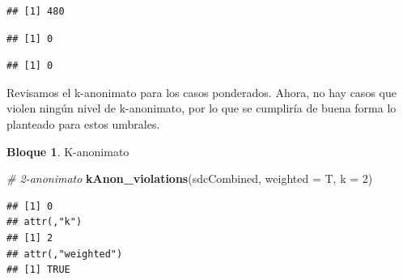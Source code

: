 \documentclass[]{book}
\newenvironment{Shaded}{\begin{snugshade}}{\end{snugshade}}
\newcommand{\CommentTok}[1]{\textcolor[rgb]{0.56,0.35,0.01}{\textit{#1}}}
\newcommand{\DataTypeTok}[1]{\textcolor[rgb]{0.13,0.29,0.53}{#1}}
\newcommand{\DecValTok}[1]{\textcolor[rgb]{0.00,0.00,0.81}{#1}}
\newcommand{\FloatTok}[1]{\textcolor[rgb]{0.00,0.00,0.81}{#1}}
\newcommand{\KeywordTok}[1]{\textcolor[rgb]{0.13,0.29,0.53}{\textbf{#1}}}
\newcommand{\NormalTok}[1]{#1}
\newcommand{\OperatorTok}[1]{\textcolor[rgb]{0.81,0.36,0.00}{\textbf{#1}}}
\newcommand{\StringTok}[1]{\textcolor[rgb]{0.31,0.60,0.02}{#1}}
\theoremstyle{definition}
\theoremstyle{definition}
\newtheorem{example}{Bloque}[chapter]
\theoremstyle{definition}
\theoremstyle{definition}
\theoremstyle{remark}
\begin{document}
\begin{verbatim}
## [1] 480
\end{verbatim}

\begin{Shaded}
\end{Shaded}

\begin{verbatim}
## [1] 0
\end{verbatim}

\begin{Shaded}
\end{Shaded}

\begin{verbatim}
## [1] 0
\end{verbatim}

Revisamos el k-anonimato para los casos ponderados. Ahora, no hay casos que violen ningún nivel de k-anonimato, por lo que se cumpliría de buena forma lo planteado para estos umbrales.

\begin{example}
\protect\hypertarget{exm:bloque68nbm}{}{\label{exm:bloque68nbm} }K-anonimato
\end{example}

\begin{Shaded}
\begin{Highlighting}[]
\CommentTok{# 2-anonimato}
\KeywordTok{kAnon_violations}\NormalTok{(sdcCombined, }\DataTypeTok{weighted =}\NormalTok{ T, }\DataTypeTok{k =} \DecValTok{2}\NormalTok{) }
\end{Highlighting}
\end{Shaded}

\begin{verbatim}
## [1] 0
## attr(,"k")
## [1] 2
## attr(,"weighted")
## [1] TRUE
\end{verbatim}
\end{document}
